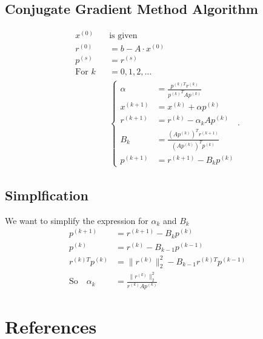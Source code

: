 \documentclass{article}
\theoremstyle{remark}
\begin{document}
 \subsection{Conjugate Gradient Method Algorithm}%
 \label{sub:conjuaget_gradient_method_algorithm}

 \begin{align*}
   x^{(0)} \quad  & \text{is given}  \\
   r^{(0)} &=   b - A\cdot x^{(0)}  \\
   p^{(s)} &=   r^{(s)}  \\
   \text{For } k&=   0,1,2, \ldots \\
    &   \begin{cases}
    \alpha &=   \frac{p^{(k)T} r^{(k)}}{{p^{(k)}}^{T} A p^{(k)}}  \\
     x ^{(k+1)} &=  x ^{(k)} + \alpha  p^{(k)}  \\
     r^{(k+1)} &=  r^{(k)} - \alpha _{k} A p^{(k)}  \\
     B_{k} &=  \frac{\left( A p^{(k)} \right)^{T} r^{(k+1)}}{ \left( Ap^{(k)} \right)^{T} p^{(k)}}   \\
     p^{(k+1)} &=  r^{(k+1)} - B_{k} p^{(k)} 
   \end{cases} 
 .\end{align*}
 
 \subsection{Simplfication }%
 \label{sub:simplfication_}
 We want to simplify the expression for $\alpha _{k}  $ and $B _{k}$
  \begin{align*}
    p^{(k+1)} &=  r^{(k+1)} - B _{k} p^{(k)} \\
    p^{(k)} &=  r^{(k)} - B_{k-1} p^{(k-1)}  \\
  r^{(k)T} p^{(k)} &= \|r^{(k)}\|_{2}^{2} - B_{k-1} r^{(k)T} p^{(k-1)} \\
  \text{So} \quad  \alpha _{k} &=  \frac{\|r^{(k)}\|_{2} ^{2} }{ r^{(k)} A p^{(k)}}    
\end{align*}
 
 
 



\newpage
\section{References}%
\label{sec:references}



  



\end{document}
